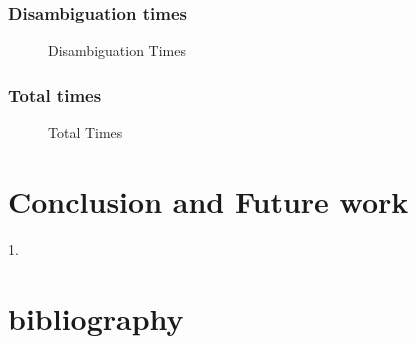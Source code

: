 \documentclass[article,dr=phil,type=drfinal,colorback,accentcolor=tud9c]{tudthesis}
\begin{document}
\subsubsection{Disambiguation times}
\begin{figure}[!htb]
	\centering
	\hspace{10mm}
	\caption[Disambiguation Times]{Disambiguation Times}
	\label{fig:compdecomp}
\end{figure}

\subsubsection{Total times}
\begin{figure}[!htb]
	\centering
	\hspace{10mm}
	\caption[Total Times]{Total Times}
	\label{fig:compdecomp}
\end{figure} 

\section{Conclusion and Future work}
1. 

\section{bibliography}
 
\end{document}
